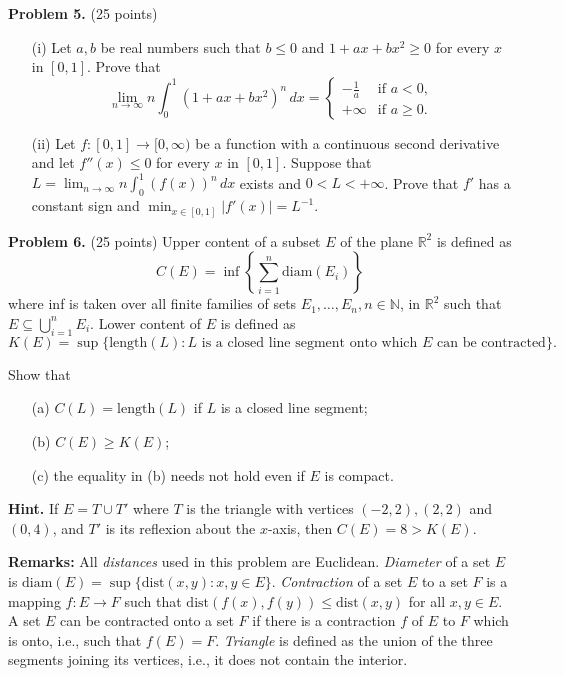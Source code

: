 \documentclass{article}
\begin{document}
\textbf{Problem 5.} (25 points)
\begin{itemize}
    \item[(i)] Let \( a, b \) be real numbers such that \( b \leq 0 \) and \( 1 + ax + bx^2 \geq 0 \) for every \( x \) in \( [0,1] \). Prove that
    \[
    \lim_{n \to \infty} n \int_{0}^{1} (1 + ax + bx^2)^n \, dx =
    \begin{cases}
    -\frac{1}{a} & \text{if } a < 0, \\
    +\infty & \text{if } a \geq 0.
    \end{cases}
    \]

    \item[(ii)] Let \( f : [0,1] \rightarrow [0,\infty) \) be a function with a continuous second derivative and let \( f''(x) \leq 0 \) for every \( x \) in \( [0,1] \). Suppose that \( L = \lim_{n \to \infty} n \int_{0}^{1} (f(x))^n \, dx \) exists and \( 0 < L < +\infty \). Prove that \( f' \) has a constant sign and \( \min_{x \in [0,1]} |f'(x)| = L^{-1} \).
\end{itemize}

\textbf{Problem 6.} (25 points)
    Upper content of a subset \( E \) of the plane \( \mathbb{R}^2 \) is defined as
    \[
    C(E) = \inf\left\{ \sum_{i=1}^{n} \text{diam}(E_i) \right\}
    \]
    where inf is taken over all finite families of sets \( E_1, \ldots, E_n, n \in \mathbb{N} \), in \( \mathbb{R}^2 \) such that \( E \subseteq \bigcup_{i=1}^{n} E_i \).
Lower content of \( E \) is defined as
\[
K(E) = \sup\{\text{length}(L) : L \text{ is a closed line segment onto which } E \text{ can be contracted}\}.
\]

Show that
\begin{itemize}
    \item[(a)] \( C(L) = \text{length}(L) \) if \( L \) is a closed line segment;
    \item[(b)] \( C(E) \geq K(E) \);
    \item[(c)] the equality in (b) needs not hold even if \( E \) is compact.
\end{itemize}
\textbf{Hint.} If \( E = T \cup T' \) where \( T \) is the triangle with vertices \( (-2, 2), (2, 2) \) and \( (0, 4) \), and \( T' \) is its reflexion about the \( x \)-axis, then \( C(E) = 8 > K(E) \).

\textbf{Remarks:} All \textit{distances} used in this problem are Euclidean.
\textit{Diameter} of a set \( E \) is \( \text{diam}(E) = \sup\{\text{dist}(x,y): x, y \in E\} \).
\textit{Contraction} of a set \( E \) to a set \( F \) is a mapping \( f : E \to F \) such that \( \text{dist}(f(x), f(y)) \leq \text{dist}(x, y) \)
for all \( x, y \in E \). A set \( E \) can be contracted onto a set \( F \) if there is a contraction \( f \) of \( E \) to \( F \) which is onto,
i.e., such that \( f(E) = F \).
\textit{Triangle} is defined as the union of the three segments joining its vertices, i.e., it does not contain the interior.
\end{document}
